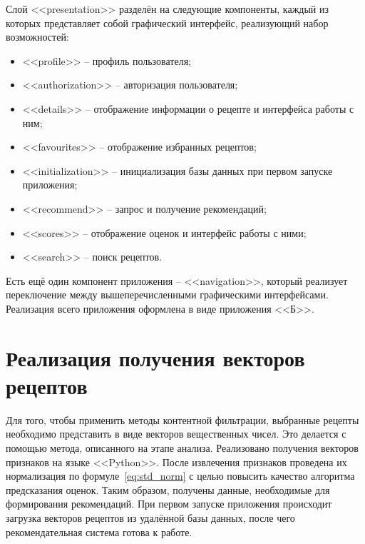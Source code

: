Слой <<presentation>> разделён на следующие компоненты, каждый из которых представляет собой графический интерфейс, реализующий набор возможностей:
\begin{itemize}
	\item <<profile>> -- профиль пользователя;
	\item <<authorization>> -- авторизация пользователя;
	\item <<details>> --  отображение информации о рецепте и интерфейса работы с ним;
	\item <<favourites>> -- отображение избранных рецептов;
	\item <<initialization>> -- инициализация базы данных при первом запуске приложения;
	\item <<recommend>> -- запрос и получение рекомендаций;
	\item <<scores>> -- отображение оценок и интерфейс работы с ними;
	\item <<search>> -- поиск рецептов.
\end{itemize}
Есть ещё один компонент приложения -- <<navigation>>, который реализует переключение между вышеперечисленными графическими интерфейсами.
Реализация всего приложения оформлена в виде приложения <<Б>>.

\section{Реализация получения векторов рецептов}
Для того, чтобы применить методы контентной фильтрации, выбранные рецепты необходимо представить в виде векторов вещественных чисел.
Это делается с помощью метода, описанного на этапе анализа.
Реализовано получения векторов признаков на языке <<Python>>.
После извлечения признаков проведена их нормализация по формуле~\eqref{eq:std_norm} с целью повысить качество алгоритма предсказания оценок.
Таким образом, получены данные, необходимые для формирования рекомендаций.
При первом запуске приложения происходит загрузка векторов рецептов из удалённой базы данных, после чего рекомендательная система готова к работе.

